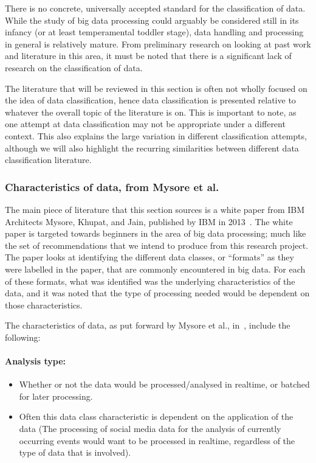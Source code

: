 \documentclass[a4paper,11pt]{article}
\begin{document}
There is no concrete, universally accepted standard for the classification of data. While the study of big data processing
could arguably be considered still in its infancy (or at least temperamental toddler stage), data handling and processing
in general is relatively mature. From preliminary research on looking at past work and literature in this area,
it must be noted that there is a significant lack of research on the classification of data.

The literature that
will be reviewed in this section is often not wholly focused on the idea of data classification, hence data classification
is presented relative to whatever the overall topic of the literature is on. This is important to note, as one attempt
at data classification may not be appropriate under a different context. This also explains the large variation in different
classification attempts, although we will also highlight the recurring similarities between different data classification
literature.



\subsubsection{Characteristics of data, from Mysore et al.} %
\label{ssub:data_charact}

The main piece of literature that this section sources is a white paper from IBM Architects Mysore, Khupat, and Jain,
published by IBM in 2013~\cite{ibm_big_2013}. The white paper is targeted towards beginners in the area of big data
processing; much like the set of recommendations that we intend to produce from this research project. The paper looks
at identifying the different data classes, or ``formats'' as they were labelled in the paper, that are commonly
encountered in big data. For each of these formats, what was identified was the underlying characteristics of the data,
and it was noted that the type of processing needed would be dependent on those characteristics.

The characteristics of data, as put forward by Mysore et al., in~\cite{ibm_big_2013}, include the following:

\paragraph{Analysis type:}

\begin{itemize}
  \item Whether or not the data would be processed/analysed in realtime, or batched for later processing.
  \item Often this data class characteristic is dependent on the application of the data (\eg{}The processing of social
  media data for the analysis of currently occurring events would want to be processed in realtime, regardless of the
  type of data that is involved).
\end{itemize}
\end{document}

